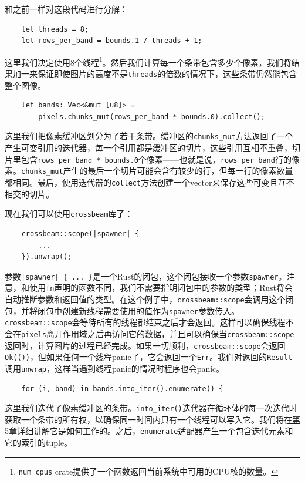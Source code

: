 和之前一样对这段代码进行分解：
\begin{verbatim}
    let threads = 8;
    let rows_per_band = bounds.1 / threads + 1;
\end{verbatim}

这里我们决定使用8个线程\footnote{\texttt{num\_cpus} crate提供了一个函数返回当前系统中可用的CPU核的数量。}。然后我们计算每一个条带包含多少个像素，我们将结果加一来保证即使图片的高度不是\texttt{threads}的倍数的情况下，这些条带仍然能包含整个图像。

\begin{verbatim}
    let bands: Vec<&mut [u8]> =
        pixels.chunks_mut(rows_per_band * bounds.0).collect();
\end{verbatim}

这里我们把像素缓冲区划分为了若干条带。缓冲区的\texttt{chunks\_mut}方法返回了一个产生可变引用的迭代器，每一个引用都是缓冲区的切片，这些引用互相不重叠，切片里包含\texttt{rows\_per\_band * bounds.0}个像素——也就是说，\texttt{rows\_per\_band}行的像素。\texttt{chunks\_mut}产生的最后一个切片可能会含有较少的行，但每一行的像素数量都相同。最后，使用迭代器的\texttt{collect}方法创建一个vector来保存这些可变且互不相交的切片。

现在我们可以使用\texttt{crossbeam}库了：
\begin{verbatim}
    crossbeam::scope(|spawner| {
        ...
    }).unwrap();
\end{verbatim}
参数\texttt{|spawner| \{ ... \}}是一个Rust的闭包，这个闭包接收一个参数\texttt{spawner}。注意，和使用\texttt{fn}声明的函数不同，我们不需要指明闭包中的参数的类型；Rust将会自动推断参数和返回值的类型。在这个例子中，\texttt{crossbeam::scope}会调用这个闭包，并将闭包中创建新线程需要使用的值作为\texttt{spawner}参数传入。\texttt{crossbeam::scope}会等待所有的线程都结束之后才会返回。这样可以确保线程不会在\texttt{pixels}离开作用域之后再访问它的数据，并且可以确保当\texttt{crossbeam::scope}返回时，计算图片的过程已经完成。如果一切顺利，\texttt{crossbeam::scope}会返回\texttt{Ok(())}，但如果任何一个线程panic了，它会返回一个\texttt{Err}。我们对返回的\texttt{Result}调用\texttt{unwrap}，这样当遇到线程panic的情况时程序也会panic。

\begin{verbatim}
    for (i, band) in bands.into_iter().enumerate() {
\end{verbatim}
这里我们迭代了像素缓冲区的条带。\texttt{into\_iter()}迭代器在循环体的每一次迭代时获取一个条带的所有权，以确保同一时间内只有一个线程可以写入它。我们将在\hyperref[ch05]{第5章}详细讲解它是如何工作的。之后，\texttt{enumerate}适配器产生一个包含迭代元素和它的索引的tuple。

